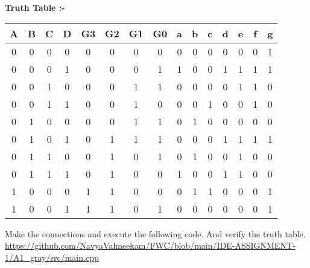 \documentclass{article}
\begin{document}
\begin{multicols}{2}
\begin{center}
\begin{tableofcontents}
\newpage
\textbf{Truth Table :-}
\vspace{5MM}
\begin{tabular}{|c|c|c|c|c|c|c|c|c|c|c|c|c|c|c|}
\hline
\textbf{A} & {B} & {C} & {D} & {G3} & {G2} & {G1} & {G0} & {a} & {b} & {c} & {d} & {e} & {f} & {g} \\
\hline
0 & 0 & 0 & 0 & 0 & 0 & 0 & 0 & 0 & 0 & 0 & 0 & 0 & 0 & 1 \\
\hline
0 & 0 & 0 & 1 & 0 & 0 & 0 & 1 & 1 & 0 & 0 & 1 & 1 & 1 & 1 \\
\hline
0 & 0 & 1 & 0 & 0 & 0 & 1 & 1 & 0 & 0 & 0 & 0 & 1 & 1 & 0 \\
\hline
0 & 0 & 1 & 1 & 0 & 0 & 1 & 0 & 0 & 0 & 1 & 0 & 0 & 1 & 0 \\
\hline
0 & 1 & 0 & 0 & 0 & 0 & 1 & 1 & 0 & 1 & 0 & 0 & 0 & 0 & 0 \\
\hline
0 & 1 & 0 & 1 & 0 & 1 & 1 & 1 & 0 & 0 & 0 & 1 & 1 & 1 & 1 \\
\hline
0 & 1 & 1 & 0 & 0 & 1 & 0 & 1 & 0 & 1 & 0 & 0 & 1 & 0 & 0 \\
\hline 
0 & 1 & 1 & 1 & 0 & 1 & 0 & 0 & 1 & 0 & 0 & 1 & 1 & 0 & 0 \\
\hline
1 & 0 & 0 & 0 & 1 & 1 & 0 & 0 & 0 & 1 & 1 & 0 & 0 & 0 & 1 \\
\hline
1 & 0 & 0 & 1 & 1 & 1 & 0 & 1 & 0 & 0 & 0 & 0 & 0 & 0 & 1 \\
\hline
\end{tabular}

\end{tableofcontents}
\end{center}
Make the connections and execute the following code. And verify the truth table. 
\newline
\href{https://github.com/NavyaValmeekam/FWC/blob/main/IDE-ASSIGNMENT-1/A1_gray/src/main.cpp}{https://github.com/NavyaValmeekam/FWC/blob/main/IDE-ASSIGNMENT-1/A1_gray/src/main.cpp}
\maketitle
\newpage
\bigskip
\renewcommand{\thefigure}{\theenumi}
\renewcommand{\thetable}{\theenumi}
%
%



\end{multicols}
\end{document}

